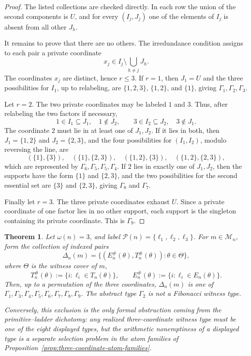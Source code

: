 \documentclass[11pt,letterpaper]{article}
\numberwithin{equation}{section}
\theoremstyle{plain}
\newtheorem{theorem}{Theorem}[section]
\theoremstyle{definition}
\theoremstyle{remark}
\begin{document}
\begin{proof}
The listed collections are checked directly. In each row the union of the
second components is $U$, and for every $(I_j,J_j)$ one of the elements of
$I_j$ is absent from all other $J_h$.

It remains to prove that there are no others. The irredundance condition
assigns to each pair a private coordinate
\[
x_j\in I_j\setminus\bigcup_{h\ne j}J_h .
\]
The coordinates $x_j$ are distinct, hence $r\le3$. If $r=1$, then
$J_1=U$ and the three possibilities for $I_1$, up to relabeling, are
\(\{1,2,3\}\), \(\{1,2\}\), and \(\{1\}\), giving
\(\Gamma_1,\Gamma_2,\Gamma_3\).

Let $r=2$. The two private coordinates may be labeled $1$ and $3$. Thus,
after relabeling the two factors if necessary,
\[
1\in I_1\subseteq J_1,\quad 1\notin J_2,\qquad
3\in I_2\subseteq J_2,\quad 3\notin J_1.
\]
The coordinate $2$ must lie in at least one of $J_1,J_2$. If it lies in both,
then \(J_1=\{1,2\}\) and \(J_2=\{2,3\}\), and the four possibilities for
\((I_1,I_2)\), modulo reversing the line, are
\[
(\{1\},\{3\}),\quad
(\{1\},\{2,3\}),\quad
(\{1,2\},\{3\}),\quad
(\{1,2\},\{2,3\}),
\]
which are represented by \(\Gamma_6,\Gamma_5,\Gamma_5,\Gamma_4\).
If $2$ lies in exactly one of $J_1,J_2$, then the supports have the form
\(\{1\}\) and \(\{2,3\}\), and the two possibilities for the second
essential set are \(\{3\}\) and \(\{2,3\}\), giving
\(\Gamma_8\) and \(\Gamma_7\).

Finally let $r=3$. The three private coordinates exhaust $U$. Since a
private coordinate of one factor lies in no other support, each support is
the singleton containing its private coordinate. This is \(\Gamma_9\).
\end{proof}

\begin{theorem}\label{thm:fibonacci-three-coordinate-types}
Let \(\omega(n)=3\), and label \(\mathcal P(n)=\{\ell_1,\ell_2,\ell_3\}\).
For \(m\in\mathcal M_n\), form the collection of indexed pairs
\[
\Delta_n(m)=\{(E_n^\#(\theta),T_n^\#(\theta)):\theta\in\Theta\},
\]
where \(\Theta\) is the witness cover of \(m\),
\[
T_n^\#(\theta):=\{i:\ell_i\in T_n(\theta)\},\qquad
E_n^\#(\theta):=\{i:\ell_i\in E_n(\theta)\}.
\]
Then, up to a permutation of the three coordinates, \(\Delta_n(m)\) is one of
\(\Gamma_1,\Gamma_3,\Gamma_4,\Gamma_5,\Gamma_6,\Gamma_7,\Gamma_8,\Gamma_9\).
The abstract type \(\Gamma_2\) is not a Fibonacci witness type.

Conversely, this exclusion is the only formal obstruction coming from the
primitive--ladder dichotomy: any realized three-coordinate witness type must be
one of the eight displayed types, but the arithmetic nonemptiness of a displayed
type is a separate selection problem in the atom families of
Proposition~\ref{prop:three-coordinate-atom-families}.
\end{theorem}
\end{document}
